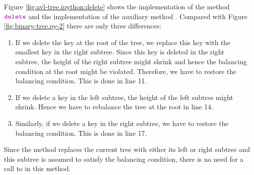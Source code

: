 Figure \ref{fig:avl-tree.ipython:delete} shows the implementation of the method $\mytt{delete}$ and the
implementation of the auxiliary method .  Compared with Figure
\ref{fig:binary-tree.py-2} there are only three differences:
\begin{enumerate}
\item If we delete the key at the root of the tree, we replace this key with the smallest key in the
      right subtree. Since this key is deleted in the right subtree, the height of the right
      subtree might shrink and hence the balancing condition at the root might be violated.
      Therefore, we have to restore the balancing condition.  This is done in line 11.
\item If we delete a key in the left subtree, the height of the left subtree might shrink.
      Hence we have to rebalance the tree at the root in line 14.
\item Similarly, if we delete a key in the right subtree, we have to restore the balancing
      condition.  This is done in line 17.
\end{enumerate}
Since the method  replaces the current tree with either its left or right subtree and this
subtree is assumed to satisfy the balancing condition, there is no need for a call to  in this
method. 

